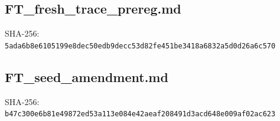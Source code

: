 \documentclass[10pt]{article}
\begin{document}
\subsection*{FT\_fresh\_trace\_prereg.md}
\noindent SHA-256: \texttt{\footnotesize 5ada6b8e6105199e8dec50edb9decc53d82fe451be3418a6832a5d0d26a6c570}\par\medskip

\clearpage
\subsection*{FT\_seed\_amendment.md}
\noindent SHA-256: \texttt{\footnotesize b47c300e6b81e49872ed53a113e084e42aeaf208491d3acd648e009af02ac623}\par\medskip

\end{document}
